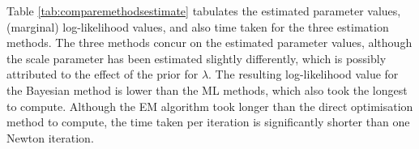 Table \ref{tab:comparemethodsestimate} tabulates the estimated parameter values, (marginal) log-likelihood values, and also time taken for the three estimation methods.
The three methods concur on the estimated parameter values, although the scale parameter has been estimated slightly differently, which is possibly attributed to the effect of the prior for $\lambda$.
The resulting log-likelihood value for the Bayesian method is lower than the ML methods, which also took the longest to compute.
Although the EM algorithm took longer than the direct optimisation method to compute, the time taken per iteration is significantly shorter than one Newton iteration.
